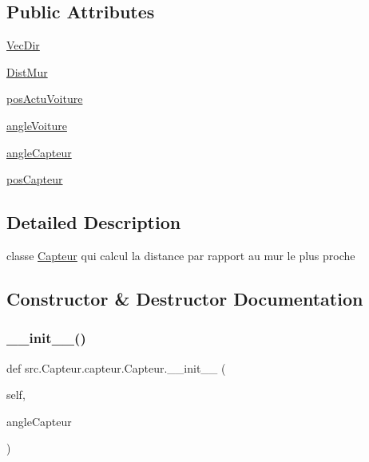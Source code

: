 \subsection*{Public Attributes}
\begin{DoxyCompactItemize}
\item 
\hyperlink{classsrc_1_1_capteur_1_1capteur_1_1_capteur_a411a9d51869e227a4a227884a6e68f27}{Vec\+Dir}
\item 
\hyperlink{classsrc_1_1_capteur_1_1capteur_1_1_capteur_a2bfa6a791da2936890cb4b9aa5def26c}{Dist\+Mur}
\item 
\hyperlink{classsrc_1_1_capteur_1_1capteur_1_1_capteur_a1baaea56e4e7c91a1b9e93977903ae1f}{pos\+Actu\+Voiture}
\item 
\hyperlink{classsrc_1_1_capteur_1_1capteur_1_1_capteur_a8ef489dc72a22c4ce580087e8f7d06f4}{angle\+Voiture}
\item 
\hyperlink{classsrc_1_1_capteur_1_1capteur_1_1_capteur_a40d8a8d89f4a45252c79eebf94eb1971}{angle\+Capteur}
\item 
\hyperlink{classsrc_1_1_capteur_1_1capteur_1_1_capteur_ad2d35f957a66e2523325b9f54b80af29}{pos\+Capteur}
\end{DoxyCompactItemize}


\subsection{Detailed Description}
classe \hyperlink{classsrc_1_1_capteur_1_1capteur_1_1_capteur}{Capteur} qui calcul la distance par rapport au mur le plus proche 

\subsection{Constructor \& Destructor Documentation}
\mbox{\label{classsrc_1_1_capteur_1_1capteur_1_1_capteur_abf779565fbdf63a3e3406165fb2182b2}} 
\subsubsection{\texorpdfstring{\+\_\+\+\_\+init\+\_\+\+\_\+()}{\_\_init\_\_()}}
{\footnotesize\ttfamily def src.\+Capteur.\+capteur.\+Capteur.\+\_\+\+\_\+init\+\_\+\+\_\+ (\begin{DoxyParamCaption}\item[{}]{self,  }\item[{}]{angle\+Capteur }\end{DoxyParamCaption})}



